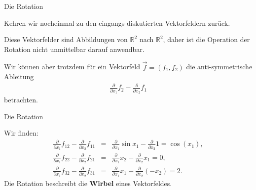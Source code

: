 \documentclass[german]{beamer}
\newcommand{\bq}{\begin{eqnarray*}}
\newcommand{\eq}{\end{eqnarray*}}
\begin{document}
\begin{frame}{Die Rotation}

\begin{example}
Kehren wir nocheinmal zu den eingangs diskutierten Vektorfeldern zur\"uck. 

\vspace*{4mm}
Diese Vektorfelder sind
Abbildungen von ${\mathbb R}^2$ nach ${\mathbb R}^2$, daher ist die Operation der Rotation nicht unmittelbar darauf anwendbar.

\vspace*{4mm}
Wir k\"onnen aber trotzdem f\"ur ein Vektorfeld $\vec{f}=(f_1,f_2)$ die anti-symmetrische Ableitung
\bq
 \frac{\partial}{\partial x_1} f_2 - \frac{\partial}{\partial x_2} f_1
\eq
betrachten.
\end{example}

\end{frame}

\begin{frame}{Die Rotation}

\begin{example}
Wir finden:
\bq
 \frac{\partial}{\partial x_1} f_{12} - \frac{\partial}{\partial x_2} f_{11}
 & = &
 \frac{\partial}{\partial x_1} \sin x_1 - \frac{\partial}{\partial x_2} 1
 = \cos(x_1),
 \nonumber \\
 \frac{\partial}{\partial x_1} f_{22} - \frac{\partial}{\partial x_2} f_{21}
 & = &
 \frac{\partial}{\partial x_1} x_2 - \frac{\partial}{\partial x_2} x_1
 = 0,
 \nonumber \\
 \frac{\partial}{\partial x_1} f_{32} - \frac{\partial}{\partial x_2} f_{31}
 & = &
 \frac{\partial}{\partial x_1} x_1 - \frac{\partial}{\partial x_2} \left( - x_2 \right)
 = 2.
\eq
Die Rotation beschreibt die {\bf Wirbel} eines Vektorfeldes.
\end{example}

\end{frame}
\end{document}
